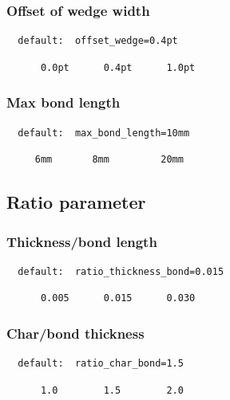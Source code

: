 \documentclass[a4paper]{article}
\makeatletter
\def\MCFstructure{\hspace{5mm}{\@strufont\char\fontnum}\advance\fontnum\@ne\relax}%
\makeatother
\begin{document}
\subsubsection{Offset of wedge width}
\begin{verbatim}
  default:  offset_wedge=0.4pt
\end{verbatim}
\MCFstructure
\vspace{-3mm}%
\begin{verbatim}
      0.0pt      0.4pt      1.0pt
\end{verbatim}
\subsubsection{Max bond length}
\begin{verbatim}
  default:  max_bond_length=10mm
\end{verbatim}
\MCFstructure
\vspace{-3mm}%
\begin{verbatim}
     6mm       8mm         20mm
\end{verbatim}
\subsection{Ratio parameter}
\subsubsection{Thickness/bond length}
\begin{verbatim}
  default:  ratio_thickness_bond=0.015
\end{verbatim}
\MCFstructure
\vspace{-3mm}%
\begin{verbatim}
      0.005      0.015      0.030
\end{verbatim}
\subsubsection{Char/bond thickness}
\begin{verbatim}
  default:  ratio_char_bond=1.5
\end{verbatim}
\MCFstructure
\vspace{-3mm}%
\begin{verbatim}
      1.0        1.5        2.0
\end{verbatim}
\end{document}
